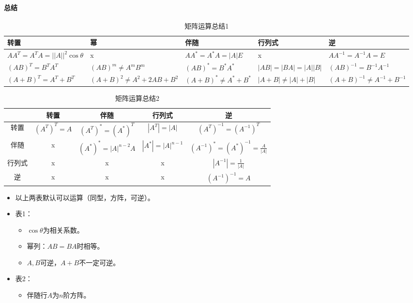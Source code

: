 \documentclass[
12pt, %
a4paper, 
oneside, %
headinclude,footinclude, %
]{scrartcl}
\begin{document}
\paragraph{总结}
\begin{table}[H]
\centering
\begin{tabular}{|p{2.8cm}|p{2.8cm}|p{2.8cm}|p{2.8cm}|p{2.8cm}|}
\hline
转置 & 幂 & 伴随 & 行列式 & 逆 \\
\hline
$ AA^T = A^TA = ||A||^2 \cos\theta $ & x & $ AA^* = A^*A = |A|E $ & x & $ AA^{-1} = A^{-1}A = E $ \\
\hline
$ (AB)^T = B^TA^T $ & $ (AB)^m \neq A^mB^m $ & $ (AB)^* = B^*A^* $ & $ |AB| = |BA| = |A||B| $ & $ (AB)^{-1} = B^{-1}A^{-1} $ \\
\hline
$ (A + B)^T = A^T + B^T $ & $ (A + B)^2 \neq A^2 + 2AB + B^2 $ & $ (A + B)^* \neq A^* + B^* $ & $ |A + B| \neq |A| + |B| $ & $ (A + B)^{-1} \neq A^{-1} + B^{-1} $ \\
\hline
\end{tabular}
\caption{矩阵运算总结1}
\end{table}

\begin{table}[H]
\centering
\begin{tabular}{|c|c|c|c|c|}
\hline
& 转置 & 伴随 & 行列式 & 逆 \\
\hline
转置 & $ (A^T)^T = A $ & $ (A^T)^* = (A^*)^T $ & $ |A^T| = |A| $ & $ (A^T)^{-1} = (A^{-1})^T $ \\
\hline
伴随 & x & $ (A^*)^* = |A|^{n - 2}A $ & $ |A^*| = |A|^{n - 1} $ & $ (A^{-1})^* = (A^*)^{-1} = \frac{A}{|A|} $ \\
\hline
行列式 & x & x & x & $ |A^{-1}| = \frac{1}{|A|} $ \\
\hline
逆 & x & x & x & $ (A^{-1})^{-1} = A $ \\
\hline
\end{tabular}
\caption{矩阵运算总结2}
\end{table}

\begin{itemize}
\item 以上两表默认可以运算（同型，方阵，可逆）。
\item 表1：
\begin{itemize}
\item $ \cos\theta $为相关系数。
\item 幂列：$ AB = BA $时相等。
\item $ A,B $可逆，$ A + B $不一定可逆。
\end{itemize}
\item 表2：
\begin{itemize}
\item 伴随行$ A $为$ n $阶方阵。
\end{itemize}
\end{itemize}
\end{document}
